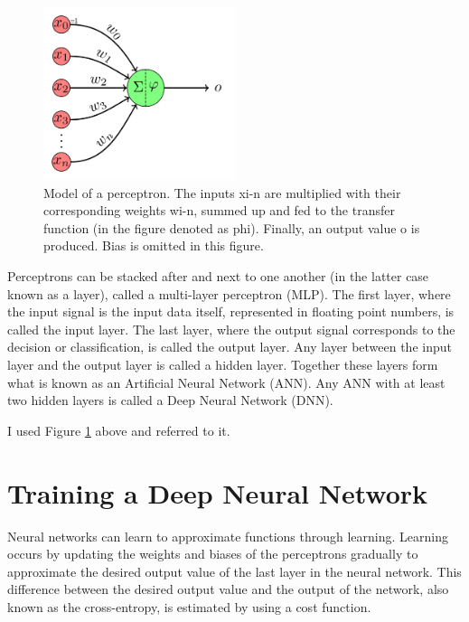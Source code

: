 \documentclass[english, bibtex]{kththesis}
\begin{document}
\begin{figure}[H]
  \begin{center}
    \includegraphics[width=0.5\textwidth]{figures/perceptron.png}
  \end{center}
  \caption{Model of a perceptron. The inputs xi-n are multiplied with their corresponding weights wi-n, summed up and fed to the transfer function (in the figure denoted as phi). Finally, an output value o is produced. Bias is omitted in this figure.}
  \label{fig:perceptron}
\end{figure}

Perceptrons can be stacked after and next to one another (in the latter case known as a layer), called a multi-layer perceptron (MLP). The first layer, where the input signal is the input data itself, represented in floating point numbers, is called the input layer. The last layer, where the output signal corresponds to the decision or classification, is called the output layer. Any layer between the input layer and the output layer is called a hidden layer. Together these layers form what is known as an Artificial Neural Network (ANN). Any ANN with at least two hidden layers is called a Deep Neural Network (DNN).

I used Figure \ref{fig:perceptron} above and referred to it.


\section{Training a Deep Neural Network}

Neural networks can learn to approximate functions through learning. Learning occurs by updating the weights and biases of the perceptrons gradually to approximate the desired output value of the last layer in the neural network. This difference between the desired output value and the output of the network, also known as the cross-entropy, is estimated by using a cost function.  
\end{document}
